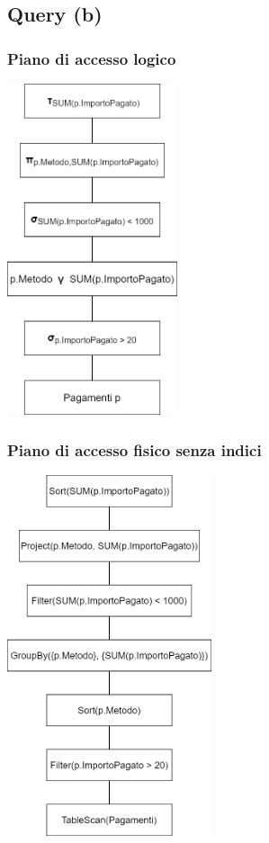 \documentclass[a4paper, 12pt]{article}
\begin{document}
\subsection{Query (b)}
\subsubsection{Piano di accesso logico}
\begin{center}
    \includegraphics[width=5cm]{pianoLogicoQueryB.png}
\end{center}   
\subsubsection{Piano di accesso fisico senza indici}
\begin{center}
    \includegraphics[width=6cm]{pianoFisicoQueryB.png}
\end{center}    
\end{document}
